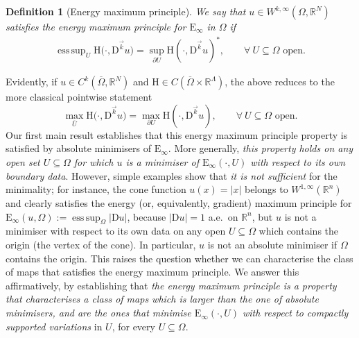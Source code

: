 \documentclass[a4paper,11pt]{article}
\numberwithin{equation}{section}
\newtheorem{Definition}[Theorem]{Definition}
\newcommand{\numberset}{\mathbb}
\newcommand{\Om}{\Omega}
\newcommand{\R}{\numberset{R}}
\newcommand{\rom}{\mathrm}
\DeclareMathOperator*{\esssup}{ess\,sup}
\theoremstyle{definition}
\begin{document}
\begin{Definition}[Energy maximum principle]
We say that $u\in W^{k,\infty}(\Om,\R^N)$ satisfies the energy maximum principle for $\mathrm E_\infty$ in $\Om$ if
\begin{align*}
\esssup_U \rom{H}\big (\cdot,\mathrm D^{\vec{k}}u \big)=\sup_{\partial U}\rom{H}(\cdot,\mathrm D ^{\vec{k}}u)^*,\qquad\forall\  U\subseteq\Om \text{ open}.
\end{align*}
\end{Definition}
\noindent
Evidently, if $u\in C^k(\overline\Om,\R^N)$ and $\rom{H}\in C(\overline\Om\times\R^\Lambda)$, the above reduces to the more classical pointwise statement
$$
\max_{\overline U} \rom{H}\big (\cdot,\mathrm D^{\vec{k}}u \big)=\max_{\partial U}\rom{H}(\cdot,\mathrm D ^{\vec{k}}u),\qquad\forall\  U\subseteq\Om \mbox{ open}.
$$
Our first main result establishes that this energy maximum principle property is satisfied by absolute minimisers of $\mathrm E_\infty$. More generally, {\it this property holds on any open set $U \subseteq \Omega$ for which $u$ is a minimiser of $\rom E_\infty(\cdot,U)$ with respect to its own boundary data}. However, simple examples show that \emph{it is not sufficient} for the minimality; for instance, the cone function $u(x)=|x|$ belongs to $W^{1,\infty}(\R^n)$ and clearly satisfies the energy (or, equivalently, gradient) maximum principle for $\mathrm E_\infty(u,\Om):=\esssup_\Om|\mathrm Du|$, because $|\mathrm D u|=1$ a.e.\ on $\mathbb R^n$, but $u$ is not a minimiser with respect to its own data on any open $U\subseteq\Om$ which contains the origin (the vertex of the cone). In particular, $u$ is not an absolute minimiser if $\Om$ contains the origin. This raises the question whether we can characterise the class of maps that satisfies the energy maximum principle. We answer this affirmatively, by establishing that {\it the energy maximum principle is a property that characterises a class of maps which is larger than the one of absolute minimisers, and are the ones that minimise $\mathrm E_\infty(\cdot,U)$ with respect to compactly supported variations} in $U$, for every $U\subseteq\Om$.
\end{document}
